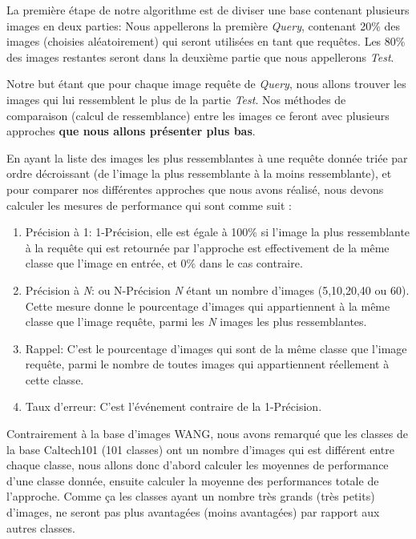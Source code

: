 	La première étape de notre algorithme est de diviser une base contenant plusieurs images en deux parties: Nous appellerons la première \textit{Query}, contenant 20\% des images (choisies aléatoirement) qui seront utilisées en tant que requêtes. Les 80\% des images restantes seront dans la deuxième partie que nous appellerons \textit{Test}.

	Notre but étant que pour chaque image requête de \textit{Query}, nous allons trouver les images qui lui ressemblent le plus de la partie \textit{Test}. Nos méthodes de comparaison (calcul de ressemblance) entre les images ce feront avec plusieurs approches \textbf{que nous allons présenter plus bas}.

	En ayant la liste des images les plus ressemblantes à une requête donnée triée par ordre décroissant (de l'image la plus ressemblante à la moins ressemblante), et pour comparer nos différentes approches que nous avons réalisé, nous devons calculer les mesures de performance qui sont comme suit : 
\begin{enumerate}

\item Précision à 1: 1-Précision, elle est égale à 100\% si l'image la plus ressemblante à la requête qui est retournée par l'approche est effectivement de la même classe que l'image en entrée, et 0\% dans le cas contraire.
\item Précision à \textit{N}: ou N-Précision \textit{N} étant un nombre d'images (5,10,20,40 ou 60). Cette mesure donne le pourcentage d'images qui appartiennent à la même classe que l'image requête, parmi les \textit{N} images les plus ressemblantes.
\item Rappel: C'est le pourcentage d'images qui sont de la même classe que l'image requête, parmi le nombre de toutes images qui appartiennent réellement à cette classe.
\item Taux d'erreur: C'est l’événement contraire de la 1-Précision.


\end{enumerate}

	Contrairement à la base d'images WANG, nous avons remarqué que les classes de la base Caltech101 (101 classes) ont un nombre d'images qui est différent entre chaque classe, nous allons donc d'abord calculer les moyennes de performance d'une classe donnée, ensuite calculer la moyenne des performances totale de l'approche. Comme ça les classes ayant un nombre très grands (très petits) d'images, ne seront pas plus avantagées (moins avantagées) par rapport aux autres classes.
	
